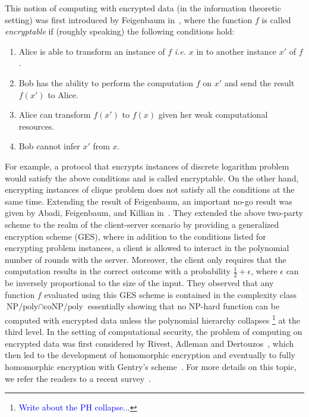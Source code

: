 This notion of computing with encrypted data (in the information theoretic setting) was first introduced by Feigenbaum in~\cite{feigenbaum1985encrypting}, where the function $f$ is called \emph{encryptable} if (roughly speaking) the following conditions hold: 
\begin{enumerate}
\item Alice is able to transform an instance of $f$ \textit{i.e.} $x$ in to another instance $x'$ of $f$. 
\item Bob has the ability to perform the computation $f$ on $x'$ and send the result $f(x')$ to Alice.
\item Alice can transform $f(x')$ to $f(x)$ given her weak computational resources. 
\item Bob cannot infer $x'$ from $x$.  
\end{enumerate} 
For example, a protocol that encrypts instances of discrete logarithm problem would satisfy the above conditions and is called encryptable. On the other hand, encrypting instances of clique problem does not satisfy all the conditions at the same time. 
Extending the result of Feigenbaum, an important no-go result was given by Abadi, Feigenbaum, and Killian in~\cite{abadi1987hiding}.  They extended the above two-party scheme to the realm of the client-server scenario by providing a generalized encryption scheme (GES), where in addition to the conditions listed for encrypting problem instances, a client is allowed to interact in the polynomial number of rounds with the server. Moreover, the client only requires that the computation results in the correct outcome with a probability $\frac{1}{2} + \epsilon$, where $\epsilon$ can be inversely proportional to the size of the input.  They observed that any function $f$ evaluated using this GES scheme is contained in the complexity class $\text{NP/poly} \cap \text{coNP/poly}$ essentially showing that no NP-hard function can be computed with encrypted data unless the polynomial hierarchy collapses \footnote{\textcolor{blue}{Write about the PH collapse...}} at the third level.
In the setting of computational security, the problem of computing on encrypted data was first considered by Rivest, Adleman and Dertouzos~\cite{rivest1978data}, which then led to the development of homomorphic encryption and eventually to fully homomorphic encryption with Gentry's scheme~\cite{gentry2009fully}.  For more details on this topic, we refer the readers to a recent survey~\cite{peikert2016decade}.

